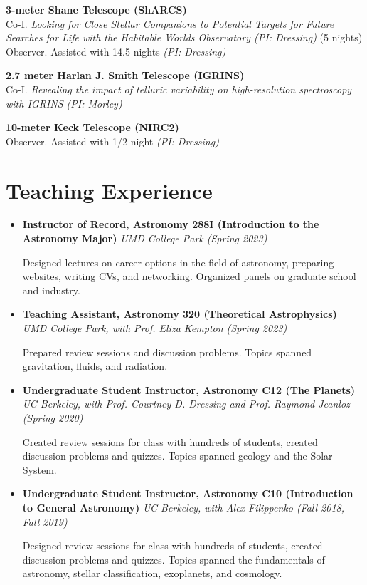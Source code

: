 \documentclass[letterpaper,10.5pt]{article}
\newcommand{\resumeItem}[2]{
  \item\small{
    \textbf{#1}{#2 \vspace{-2pt}}
  }
}
\newcommand{\resumeSubHeadingListEnd}{\end{itemize}}
\newcommand{\resumeItemListStart}{\begin{itemize}}
\newcommand{\shorterSection}[1]{\vspace{-10pt}\section{#1}}
\begin{document}
\begin{list}{}{\cvlist}
     \item[{\color{numcolor}}]\textbf{3-meter Shane Telescope (ShARCS)} \\
     Co-I.  \textit{Looking for Close Stellar Companions to Potential Targets for Future Searches for Life with the Habitable Worlds Observatory (PI: Dressing)} (5 nights)\\
     Observer. Assisted with 14.5 nights \textit{(PI: Dressing)}


     \item[{\color{numcolor}}]\textbf{2.7 meter Harlan J. Smith Telescope (IGRINS)} \\
     Co-I. \textit{Revealing the impact of telluric variability on high-resolution spectroscopy with IGRINS (PI: Morley)}

     
     \item[{\color{numcolor}}]\textbf{10-meter Keck Telescope (NIRC2)} \\
     Observer. Assisted with 1/2 night \textit{(PI: Dressing)}
  
  \end{list}




\shorterSection{Teaching Experience}
\resumeItemListStart
\resumeItem{Instructor of Record, Astronomy 288I (Introduction to the Astronomy Major)}{ \textit{UMD College Park (Spring 2023)}}
    
    Designed lectures on career options in the field of astronomy, preparing websites, writing CVs, and networking. Organized panels on graduate school and industry. 
\resumeItem{Teaching Assistant, Astronomy 320 (Theoretical Astrophysics)}{ \textit{UMD College Park, with Prof. Eliza Kempton (Spring 2023)}}

Prepared review sessions and discussion problems. Topics spanned gravitation, fluids, and radiation.
\resumeItem{Undergraduate Student Instructor, Astronomy C12 (The Planets)}{ \textit{UC Berkeley, with Prof. Courtney D. Dressing and Prof. Raymond Jeanloz (Spring 2020)}}

Created review sessions for class with hundreds of students, created discussion problems and quizzes. Topics spanned geology and the Solar System.
\resumeItem{Undergraduate Student Instructor, Astronomy C10 (Introduction to General Astronomy)}{\textit{ UC Berkeley, with Alex Filippenko (Fall 2018, Fall 2019)}}

Designed review sessions for class with hundreds of students, created discussion problems and quizzes. Topics spanned the fundamentals of astronomy, stellar classification, exoplanets, and cosmology.
\resumeSubHeadingListEnd
\end{document}
